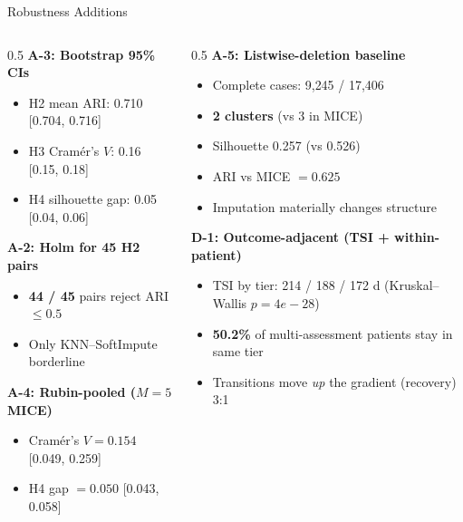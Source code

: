 \documentclass[aspectratio=169, 11pt]{beamer}
\begin{document}
\begin{frame}{Robustness Additions}
  \small
  \begin{columns}[T]
    \begin{column}{0.5\textwidth}
      \textbf{A-3: Bootstrap 95\% CIs}
      \begin{itemize}\small
        \item H2 mean ARI: 0.710 [0.704, 0.716]
        \item H3 Cram\'er's $V$: 0.16 [0.15, 0.18]
        \item H4 silhouette gap: 0.05 [0.04, 0.06]
      \end{itemize}

      \vspace{0.3em}
      \textbf{A-2: Holm for 45 H2 pairs}
      \begin{itemize}\small
        \item \textbf{44 / 45} pairs reject ARI${\le}0.5$
        \item Only KNN--SoftImpute borderline
      \end{itemize}

      \vspace{0.3em}
      \textbf{A-4: Rubin-pooled ($M{=}5$ MICE)}
      \begin{itemize}\small
        \item Cram\'er's $V = 0.154$ [0.049, 0.259]
        \item H4 gap $= 0.050$ [0.043, 0.058]
      \end{itemize}
    \end{column}
    \begin{column}{0.5\textwidth}
      \textbf{A-5: Listwise-deletion baseline}
      \begin{itemize}\small
        \item Complete cases: 9{,}245 / 17{,}406
        \item \textbf{2 clusters} (vs 3 in MICE)
        \item Silhouette 0.257 (vs 0.526)
        \item ARI vs MICE $= 0.625$
        \item[$\Rightarrow$] Imputation materially changes structure
      \end{itemize}

      \vspace{0.3em}
      \textbf{D-1: Outcome-adjacent (TSI + within-patient)}
      \begin{itemize}\small
        \item TSI by tier: 214 / 188 / 172 d (Kruskal--Wallis $p{=}4e{-}28$)
        \item \textbf{50.2\%} of multi-assessment patients stay in same tier
        \item Transitions move \emph{up} the gradient (recovery) 3:1
      \end{itemize}
    \end{column}
  \end{columns}
\end{frame}
\end{document}
